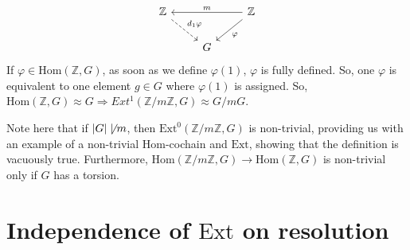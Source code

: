 \documentclass[a4paper,11pt, tikz]{article}
\newcommand{\lb}{\left(}
\newcommand{\rb}{\right)}
\newcommand{\Z}{\mathbb{Z}}
\newcommand{\f}{\varphi}
\newcommand{\Hom}{\text{Hom}}
\newcommand{\Ext}{\text{Ext}}
\renewcommand{\implies}{\Rightarrow}
\newcommand{\tends}{\rightarrow}
\begin{document}
\begin{equation*}
\begin{tikzcd}
\Z \arrow[dr, dashrightarrow, "d_1\f"] &&  \Z \arrow[ll, "m"']\arrow[dl, "\f"]\\
&G&
\end{tikzcd}
\end{equation*}
If $\f\in\Hom\lb\Z, G\rb$, as soon as we define $\f(1)$, $\f$ is fully defined. So, one $\f$ is equivalent to one element $g\in G$ where $\f(1)$ is assigned. So, $\Hom\lb\Z, G\rb\approx G\implies Ext^1\lb \Z/m\Z, G\rb\approx G/m G$.

Note here that if $|G|\not\mid m$, then $\Ext^0\lb \Z/m\Z, G\rb$ is non-trivial, providing us with an example of a non-trivial $\Hom$-cochain and $\Ext$, showing that the definition is vacuously true. Furthermore, $\Hom\lb\Z/m\Z, G\rb\tends \Hom\lb\Z, G\rb$ is non-trivial only if $G$ has a torsion.

\section{Independence of $\Ext$ on resolution}
\end{document}
